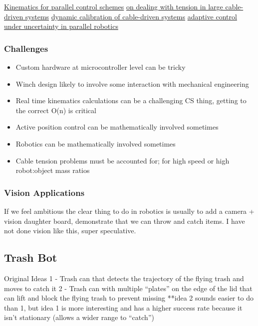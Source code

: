 \documentclass[11pt]{article}
\begin{document}
\href{https://www.cambridge.org/core/services/aop-cambridge-core/content/view/B129C939BF4491AA693A36A54AE6D2C7/S0263574721001971a.pdf/full-dynamic-model-of-3-upu-translational-parallel-manipulator-for-model-based-control-schemes.pdf}{Kinematics for parallel control schemes}
\href{https://ieeexplore.ieee.org/stamp/stamp.jsp?arnumber=9737194}{on dealing with tension in large cable-driven systems}
\href{https://ieeexplore.ieee.org/stamp/stamp.jsp?arnumber=9737158}{dynamic calibration of cable-driven systems}
\href{https://arxiv.org/pdf/2003.08860.pdf}{adaptive control under uncertainty in parallel robotics}

\subsubsection{Challenges}
\label{sec:orgec4890b}

\begin{itemize}
\item Custom hardware at microcontroller level can be tricky
\item Winch design likely to involve some interaction with mechanical engineering
\item Real time kinematics calculations can be a challenging CS thing, getting to the correct O(n) is critical
\item Active position control can be mathematically involved sometimes
\item Robotics can be mathematically involved sometimes
\item Cable tension problems must be accounted for; for high speed or high robot:object mass ratios
\end{itemize}

\subsubsection{Vision Applications}
\label{sec:org794f5da}

If we feel ambitious the clear thing to do in robotics is usually to add a camera + vision daughter board, demonstrate that we can throw and catch items. I have not done vision like this, super speculative.


\subsection{Trash Bot}
\label{sec:org2dfda01}

Original Ideas
1 - Trash can that detects the trajectory of the flying trash and moves to catch it
2 - Trash can with multiple “plates” on the edge of the lid that can lift and block the flying trash to prevent missing
**idea 2 sounds easier to do than 1, but idea 1 is more interesting and has a higher success rate because it isn’t stationary (allows a wider range to “catch”)
\end{document}
